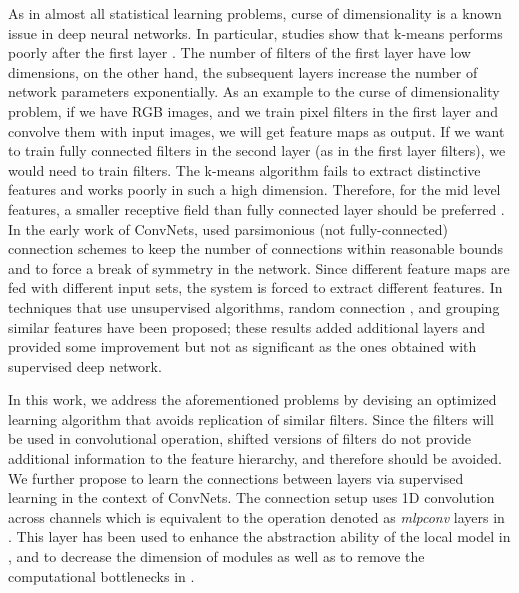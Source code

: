 \documentclass{article} \usepackage{iclr2016_workshop,times}
\begin{document}
As in almost all statistical learning problems, curse of dimensionality is a known issue in deep neural networks.
In particular, studies show that  k-means performs poorly after the first layer \citep{coates2011selecting}. 
The number of filters of the first layer have low dimensions, on the other hand, the subsequent layers increase the number of network parameters exponentially.
As an example to the curse of dimensionality problem, if we have  RGB images, and we train   pixel filters in the first layer and convolve them with input images, we will get  feature maps as output.
If we want to train fully connected filters in the second layer (as in the first layer filters), we would need to train  filters.
The k-means algorithm fails to extract distinctive features and works poorly in such a high dimension. Therefore, for the mid level features, a smaller receptive field than fully connected layer should be preferred \citep{coates2011selecting}.
In the early work of ConvNets, \citet{lecun1998gradient} used parsimonious (not fully-connected) connection schemes to keep the number of connections within reasonable bounds and to force a break of symmetry in the network. Since different feature maps are fed with different input sets, the system is forced to extract different features. 
In techniques that use unsupervised algorithms, random connection \citep{culurciello2013analysis}, and grouping similar features \citep{coates2011selecting} have been proposed; these results added additional layers and provided some improvement but not as significant as the ones obtained with supervised deep network.




In this work, we address the aforementioned problems
by devising an optimized learning algorithm that avoids replication of similar filters. Since the filters will be used in convolutional operation, shifted versions of filters do not provide additional information to the feature hierarchy, and therefore should be avoided. 
We further propose to learn the connections between layers via supervised learning in the context of ConvNets. The connection setup uses 1D convolution across channels which is equivalent to the operation denoted as \emph{mlpconv} layers in \citet{lin_2013_nin}.
This layer has been used to enhance the abstraction ability of the local model in \citet{lin_2013_nin}, and to decrease the dimension of modules as well as to remove the computational bottlenecks in \citet{szegedy2014going}.
\end{document}
